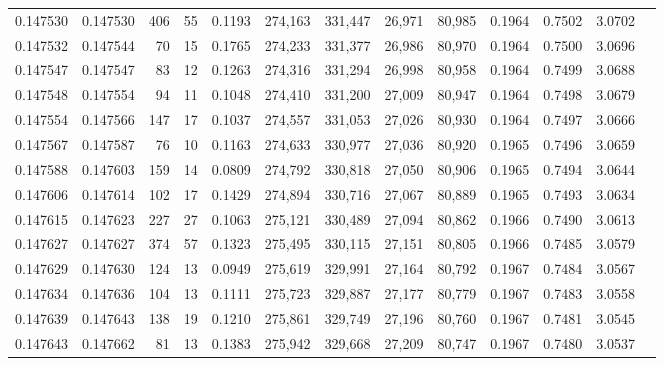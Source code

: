 \begin{tabular}{rrrrrrrrrrrrr}
0.147530 & 0.147530 &   406 &  55 &                                     0.1193 & 274,163 & 331,447 &  26,971 &  80,985 & 0.1964 & 0.7502 & 3.0702 \\
0.147532 & 0.147544 &    70 &  15 &                                     0.1765 & 274,233 & 331,377 &  26,986 &  80,970 & 0.1964 & 0.7500 & 3.0696 \\
0.147547 & 0.147547 &    83 &  12 &                                     0.1263 & 274,316 & 331,294 &  26,998 &  80,958 & 0.1964 & 0.7499 & 3.0688 \\
0.147548 & 0.147554 &    94 &  11 &                                     0.1048 & 274,410 & 331,200 &  27,009 &  80,947 & 0.1964 & 0.7498 & 3.0679 \\
0.147554 & 0.147566 &   147 &  17 &                                     0.1037 & 274,557 & 331,053 &  27,026 &  80,930 & 0.1964 & 0.7497 & 3.0666 \\
0.147567 & 0.147587 &    76 &  10 &                                     0.1163 & 274,633 & 330,977 &  27,036 &  80,920 & 0.1965 & 0.7496 & 3.0659 \\
0.147588 & 0.147603 &   159 &  14 &                                     0.0809 & 274,792 & 330,818 &  27,050 &  80,906 & 0.1965 & 0.7494 & 3.0644 \\
0.147606 & 0.147614 &   102 &  17 &                                     0.1429 & 274,894 & 330,716 &  27,067 &  80,889 & 0.1965 & 0.7493 & 3.0634 \\
0.147615 & 0.147623 &   227 &  27 &                                     0.1063 & 275,121 & 330,489 &  27,094 &  80,862 & 0.1966 & 0.7490 & 3.0613 \\
0.147627 & 0.147627 &   374 &  57 &                                     0.1323 & 275,495 & 330,115 &  27,151 &  80,805 & 0.1966 & 0.7485 & 3.0579 \\
0.147629 & 0.147630 &   124 &  13 &                                     0.0949 & 275,619 & 329,991 &  27,164 &  80,792 & 0.1967 & 0.7484 & 3.0567 \\
0.147634 & 0.147636 &   104 &  13 &                                     0.1111 & 275,723 & 329,887 &  27,177 &  80,779 & 0.1967 & 0.7483 & 3.0558 \\
0.147639 & 0.147643 &   138 &  19 &                                     0.1210 & 275,861 & 329,749 &  27,196 &  80,760 & 0.1967 & 0.7481 & 3.0545 \\
0.147643 & 0.147662 &    81 &  13 &                                     0.1383 & 275,942 & 329,668 &  27,209 &  80,747 & 0.1967 & 0.7480 & 3.0537 \\

\end{tabular}
